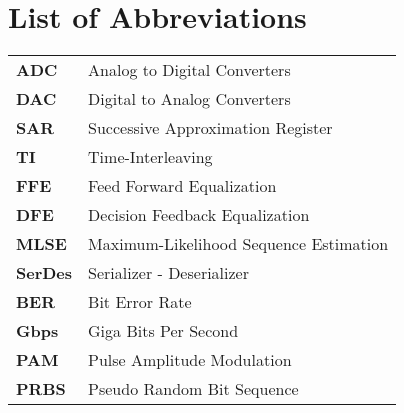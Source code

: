 \chapter*{List of Abbreviations}
\begin{longtable}[l]{>{\bfseries}ll} 
ADC & Analog to Digital Converters\\
DAC & Digital to Analog Converters\\
SAR & Successive Approximation Register\\
TI & Time-Interleaving\\
FFE & Feed Forward Equalization\\
DFE & Decision Feedback Equalization\\
MLSE & Maximum-Likelihood Sequence Estimation\\
SerDes &  Serializer - Deserializer\\
BER & Bit Error Rate\\
Gbps & Giga Bits Per Second\\
PAM & Pulse Amplitude Modulation\\
PRBS & Pseudo Random Bit Sequence\\


\end{longtable}

